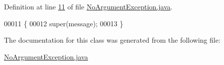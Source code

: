Definition at line \hyperlink{NoArgumentException_8java_source_l00011}{11} of file \hyperlink{NoArgumentException_8java_source}{No\-Argument\-Exception.\-java}.


\begin{DoxyCode}
00011                                               \{
00012         super(message);
00013     \}
\end{DoxyCode}


The documentation for this class was generated from the following file\-:\begin{DoxyCompactItemize}
\item 
\hyperlink{NoArgumentException_8java}{No\-Argument\-Exception.\-java}\end{DoxyCompactItemize}
